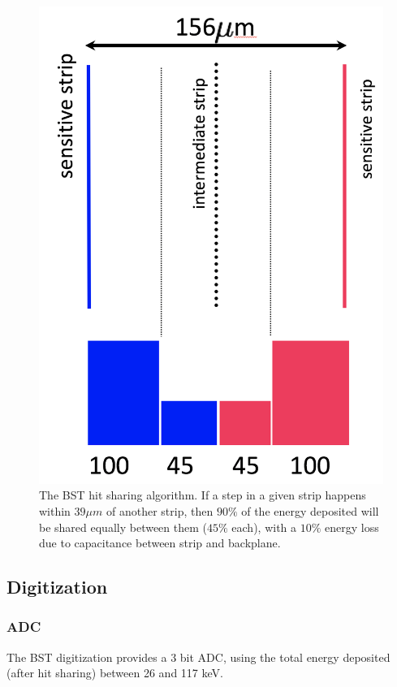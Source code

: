 \begin{figure}[t]
	\centering
	\includegraphics[width=0.95\columnwidth,keepaspectratio]{img/bstHitSharing.png}
	\caption{The BST hit sharing algorithm. If a step in a given strip happens within $39 \mu m$ of another strip, then
            $90\%$ of the energy deposited will be shared equally between them ($45\%$ each), with a $10\%$ energy loss due
	         to capacitance between strip and backplane.}
	\label{fig:bstHitSharing}
\end{figure}


\subsection{Digitization}

\subsubsection{ADC}
The BST digitization provides a 3 bit ADC, using the total energy deposited (after hit sharing) between 26 and 117 keV.

